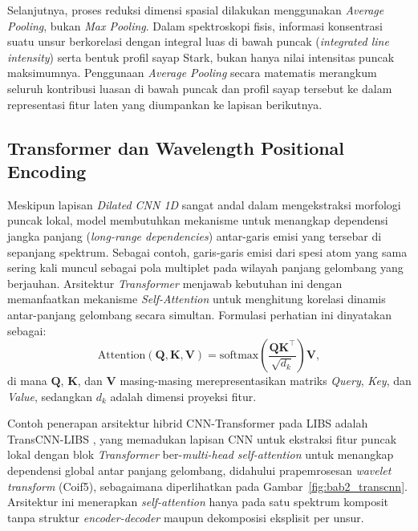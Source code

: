 Selanjutnya, proses reduksi dimensi spasial dilakukan menggunakan \textit{Average Pooling}, bukan \textit{Max Pooling}. Dalam spektroskopi fisis, informasi konsentrasi suatu unsur berkorelasi dengan integral luas di bawah puncak (\textit{integrated line intensity}) serta bentuk profil sayap Stark, bukan hanya nilai intensitas puncak maksimumnya. Penggunaan \textit{Average Pooling} secara matematis merangkum seluruh kontribusi luasan di bawah puncak dan profil sayap tersebut ke dalam representasi fitur laten yang diumpankan ke lapisan berikutnya.

\subsection{Transformer dan Wavelength Positional Encoding} \label{subsec:bab2_transformer}

Meskipun lapisan \textit{Dilated CNN 1D} sangat andal dalam mengekstraksi morfologi puncak lokal, model membutuhkan mekanisme untuk menangkap dependensi jangka panjang (\textit{long-range dependencies}) antar-garis emisi yang tersebar di sepanjang spektrum. Sebagai contoh, garis-garis emisi dari spesi atom yang sama sering kali muncul sebagai pola multiplet pada wilayah panjang gelombang yang berjauhan. Arsitektur \textit{Transformer} \citep{vaswani_attention_2017} menjawab kebutuhan ini dengan memanfaatkan mekanisme \textit{Self-Attention} untuk menghitung korelasi dinamis antar-panjang gelombang secara simultan. Formulasi perhatian ini dinyatakan sebagai:
\begin{equation} \label{eq:bab2_attention}
\mathrm{Attention}(\mathbf{Q},\mathbf{K},\mathbf{V}) = \mathrm{softmax}\!\left(\frac{\mathbf{Q}\mathbf{K}^\top}{\sqrt{d_k}}\right)\mathbf{V},
\end{equation}
di mana $\mathbf{Q}$, $\mathbf{K}$, dan $\mathbf{V}$ masing-masing merepresentasikan matriks \textit{Query}, \textit{Key}, dan \textit{Value}, sedangkan $d_k$ adalah dimensi proyeksi fitur.

Contoh penerapan arsitektur hibrid CNN-Transformer pada LIBS adalah TransCNN-LIBS \citep{liu_remote_2026}, yang memadukan lapisan CNN untuk ekstraksi fitur puncak lokal dengan blok \textit{Transformer} ber-\textit{multi-head self-attention} untuk menangkap dependensi global antar panjang gelombang, didahului prapemrosesan \textit{wavelet transform} (Coif5), sebagaimana diperlihatkan pada Gambar~\ref{fig:bab2_transcnn}. Arsitektur ini menerapkan \textit{self-attention} hanya pada satu spektrum komposit tanpa struktur \textit{encoder-decoder} maupun dekomposisi eksplisit per unsur.

